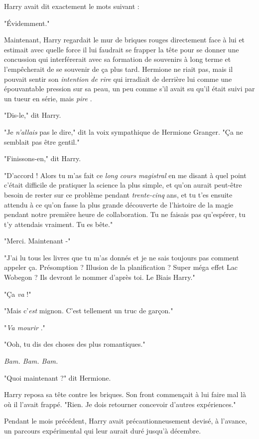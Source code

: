 Harry avait dit exactement le mots suivant :

"Évidemment."

Maintenant, Harry regardait le mur de briques rouges directement face à lui et estimait avec quelle force il lui faudrait se frapper la tête pour se donner une concussion qui interférerait avec sa formation de souvenirs à long terme et l'empêcherait de se souvenir de ça plus tard. Hermione ne riait pas, mais il pouvait sentir son \emph{intention de rire}  qui irradiait de derrière lui comme une épouvantable pression sur sa peau, un peu comme s'il avait su qu'il était suivi par un tueur en série, mais \emph{pire} .

"Dis-le," dit Harry.

"Je \emph{n'allais}  pas le dire," dit la voix sympathique de Hermione Granger. "Ça ne semblait pas être gentil."

"Finissons-en," dit Harry.

"D'accord ! Alors tu m'as fait ce \emph{long cours magistral}  en me disant à quel point c'était difficile de pratiquer la science la plus simple, et qu'on aurait peut-être besoin de rester sur ce problème pendant \emph{trente-cinq}  ans, et tu t'es ensuite attendu à ce qu'on fasse la plus grande découverte de l'histoire de la magie pendant notre première heure de collaboration. Tu ne faisais pas qu'espérer, tu t'y attendais vraiment. Tu es bête."

"Merci. Maintenant -"

"J'ai lu tous les livres que tu m'as donnés et je ne sais toujours pas comment appeler ça. Présomption ? Illusion de la planification ? Super méga effet Lac Wobegon ? Ils devront le nommer d'après toi. Le Biais Harry."

"Ça \emph{va}  !"

"Mais c'\emph{est}  mignon. C'est tellement un truc de garçon."

"\emph{Va mourir} ."

"Ooh, tu dis des choses des plus romantiques."

\emph{Bam. Bam. Bam.} 

"Quoi maintenant ?" dit Hermione.

Harry reposa sa tête contre les briques. Son front commençait à lui faire mal là où il l'avait frappé. "Rien. Je dois retourner concevoir d'autres expériences."

Pendant le mois précédent, Harry avait précautionneusement devisé, à l'avance, un parcours expérimental qui leur aurait duré jusqu'à décembre.

